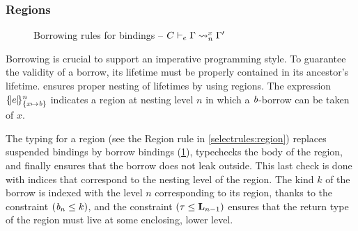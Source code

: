 \subsubsection{Regions}
\label{sdtyping:regions}
\begin{figure}[tp]
  \begin{minipage}{\linewidth}
    \centering


    \begin{mathpar}
    \end{mathpar}
    \caption{Borrowing rules for bindings -- $\lregion{C}{x}{\E}{\E'}$}
    \label{env:rule:borrow}
  \end{minipage}
\end{figure}

Borrowing is crucial to support an imperative programming style.
To guarantee the validity of a borrow, its lifetime must be properly contained in its
ancestor's lifetime. \lang ensures proper nesting of lifetimes by using
regions. The expression $\region{\Sone x\BORROW}{e}$ indicates a
region at nesting level $n$ in which a $\BORROW$-borrow can be taken of $x$.

The typing for a region (see the {\sc Region} rule in \cref{selectrules:region})
replaces suspended bindings by borrow bindings
(\cref{env:rule:borrow}), typechecks the body
of the region, and finally ensures that the borrow does not leak outside.
This last check is done with indices that correspond to the nesting
level of the region. The kind $k$ of the borrow is indexed with the level $n$
corresponding to its region, thanks to the constraint $(\BORROW_n\lk
k)$, and the constraint $\Cleq{\tau}{\klin_{n-1}}$ ensures that
the return type of the region must live at some enclosing, lower level.

